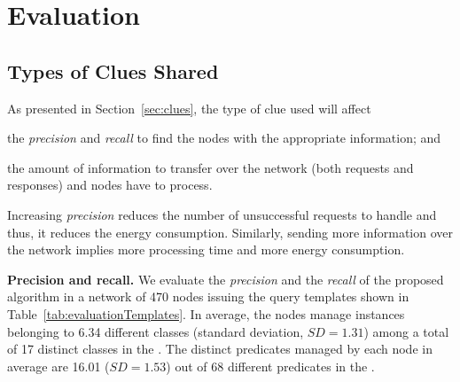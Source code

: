 \section{Evaluation}
\label{sec:search_evaluation}

\subsection{Types of Clues Shared}
\label{sec:clues_eval}
As presented in Section~\ref{sec:clues}, the type of clue used will affect
\begin{enumerate*}[label=\itshape(\arabic*\upshape)]
  \item the \emph{precision} and \emph{recall} to find the nodes with the appropriate information; and %
  \item the amount of information to transfer over the network (both requests and responses) and nodes have to process.
\end{enumerate*}
Increasing \emph{precision} reduces the number of unsuccessful requests to handle and thus, it reduces the energy consumption. 
Similarly, sending more information over the network implies more processing time and more energy consumption.

\medskip

\noindent\textbf{Precision and recall.}
We evaluate the \emph{precision} and the \emph{recall} of the proposed algorithm in a network of 470 nodes issuing the query templates shown in Table~\ref{tab:evaluationTemplates}.
In average, the nodes manage instances belonging to 6.34 different classes (standard deviation, $SD=1.31$) among a total of 17 distinct classes in the \Space{}.
The distinct predicates managed by each node in average are 16.01 ($SD=1.53$) out of 68 different predicates in the \Space{}.


\newcommand{\tplone}{\emph{T1}}
\newcommand{\tpltwo}{\emph{T2}}
\newcommand{\tplthree}{\emph{T3}}
\newcommand{\tplfour}{\emph{T4}}
\newcommand{\tplfive}{\emph{T5}}





